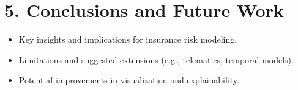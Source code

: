 \documentclass[
  number,
  review,
  3p]{elsarticle}
\providecommand{\tightlist}{%
  \setlength{\itemsep}{0pt}\setlength{\parskip}{0pt}}
\begin{document}
\section{5. Conclusions and Future
Work}\label{conclusions-and-future-work}

\begin{itemize}
\tightlist
\item
  Key insights and implications for insurance risk modeling.
\item
  Limitations and suggested extensions (e.g., telematics, temporal
  models).
\item
  Potential improvements in visualization and explainability.
\end{itemize}


\renewcommand\refname{References}

\end{document}
